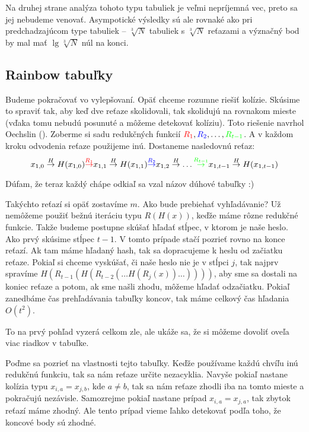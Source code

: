 Na druhej strane analýza tohoto typu tabuliek je veľmi nepríjemná vec,
preto sa jej nebudeme venovať. 
Asympotické výsledky sú ale rovnaké ako pri predchadzajúcom type tabuliek
-- $\sqrt[3]{N}$ tabuliek s $\sqrt[3]{N}$
reťazami a význačný bod by mal mať $\lg \sqrt[3]{N}$ núl na konci.

\subsection{Rainbow tabuľky}
Budeme pokračovať vo vylepšovaní.
Opäť chceme rozumne riešiť kolízie.
Skúsime to spraviť tak, aby keď dve reťaze skolidovali,
tak skolidujú na rovnakom mieste (vďaka tomu nebudú posunuté
a môžeme detekovať kolíziu). 
Toto riešenie navrhol Oechslin (\cite{Oechslin2003Making}).
Zoberme si sadu redukčných funkcií ${\color{red}R_1}, {\color{blue}R_2}, \dots, {\color{green}R_{t-1}}$.
A v každom kroku odvodenia reťaze použijeme inú.
Dostaneme nasledovnú reťaz:
\begin{equation*}
    x_{1,0} \toa{H} H(x_{1,0}) {\color{red} \toa{R_1} }
    x_{1,1} \toa{H} H(x_{1,1}) {\color{blue} \toa{R_2} }
    x_{1,2} \toa{H} \dots {\color{green} \toa{R_{t-1}} }
    x_{1, t-1} \toa{H} H(x_{1,t-1})
\end{equation*}

\begin{poznamka}
	Dúfam, že teraz každý chápe odkiaľ sa vzal názov dúhové tabuľky :)
\end{poznamka}

Takýchto reťazí si opäť zostavíme $m$. Ako bude prebiehať vyhľadávanie? 
Už nemôžeme použiť bežnú iteráciu typu $R(H(x))$,
keďže máme rôzne redukčné funkcie.
Takže budeme postupne skúšať hľadať stĺpec, v ktorom je naše heslo.
Ako prvý skúsime stĺpec $t-1$.
V tomto prípade stačí pozrieť rovno na konce reťazí.
Ak tam máme hľadaný hash, tak sa dopracujeme k heslu od začiatku
reťaze.
Pokiaľ si chceme vyskúšať, či naše heslo nie je v stĺpci $j$,
tak najprv spravíme $H(R_{t-1}(H(R_{t-2}(\dots H(R_j(x))\dots))))$,
aby sme sa dostali na koniec reťaze a potom, ak sme našli zhodu,
môžeme hľadať odzačiatku.
Pokiaľ zanedbáme čas prehľadávania tabuľky koncov,
tak máme celkový čas hľadania $O(t^2)$. 

To na prvý pohľad vyzerá celkom zle, ale ukáže sa,
že si môžeme dovoliť oveľa viac riadkov v tabuľke.

Poďme sa pozrieť na vlastnosti tejto tabuľky.
Keďže používame každú chvíľu inú redukčnú funkciu, tak sa nám
reťaze určite nezacyklia. Navyše pokiaľ nastane kolízia typu 
$x_{i,a} = x_{j,b}$, kde $a\neq b$, tak sa nám
reťaze zhodli iba na tomto mieste a pokračujú nezávisle.
Samozrejme pokiaľ nastane prípad $x_{i,a} = x_{j,a}$, tak
zbytok reťazí máme zhodný. Ale tento prípad vieme ľahko detekovať podľa toho,
že koncové body sú zhodné.

